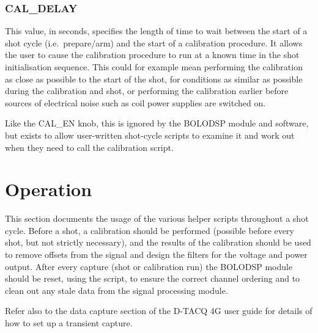 \documentclass[12pt,a4paper]{article}
\begin{document}
\subsubsection{CAL{\_}DELAY}
This value, in seconds, specifies the length of time to wait between the start of a shot cycle (i.e.~prepare/arm) and the start of a calibration
procedure. It allows the user to cause the calibration procedure to run at a known time in the shot initialisation sequence. This could for example mean
performing the calibration as close as possible to the start of the shot, for conditions as similar as possible during the calibration and shot, or
performing the calibration earlier before sources of electrical noise such as coil power supplies are switched on.

Like the CAL{\_}EN knob, this is ignored by the BOLODSP module and software, but exists to allow user-written shot-cycle scripts to examine it and work
out when they need to call the calibration script.

\section{Operation}
\label{sec:operation}
This section documents the usage of the various helper scripts throughout a shot cycle. Before a shot, a calibration should be performed (possible before
every shot, but not strictly necessary), and the results of the calibration should be used to remove offsets from the signal and design the filters for
the voltage and power output. After every capture (shot or calibration run) the BOLODSP module should be reset, using the
\mbox{} script, to ensure the correct channel ordering and to clean out any stale data from the signal processing
module.

Refer also to the data capture section of the D-TACQ 4G user guide for details of how to set up a transient capture.
\end{document}
